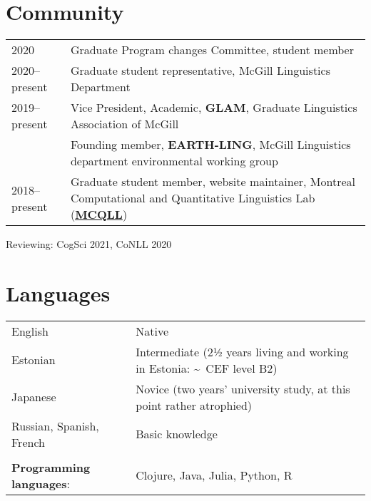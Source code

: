 \documentclass[11pt,a4paper]{article}
\begin{document}
  \section{Community}
  \begin{longtable}{p{2cm}|p{14.5cm}}
    2020
    &%
      Graduate Program changes Committee, student member\\
    \textsc{2020--}present
    &%
      Graduate student representative, McGill Linguistics Department\\
    \textsc{2019--}present
    &%
      Vice President, Academic, \textbf{GLAM}, Graduate Linguistics Association
      of McGill\\
    &%
      Founding member, \textbf{EARTH-LING}, McGill Linguistics department
      environmental working group\\
    \textsc{2018--}present
    &%
      Graduate student member, website maintainer, Montreal Computational and
      Quantitative Linguistics Lab (\href{http://mcqll.org}{\textbf{MCQLL}})\\
  \end{longtable}
  Reviewing: CogSci 2021, CoNLL 2020
  \section{Languages}

  \begin{longtable}[l]{ll}
    English
    &%
      Native\\
    Estonian 
    &%
      Intermediate (2½ years living and working in Estonia:
      \textasciitilde\ CEF level B2)\\
    Japanese
    &%
      Novice (two years' university study, at this point rather atrophied)\\
    Russian, Spanish, French%
    &%
      Basic knowledge\\
    \multicolumn{2}{c}{}\\
    \textbf{Programming languages}:
    &%
      Clojure, Java, Julia, Python, R
  \end{longtable}
\end{document}
